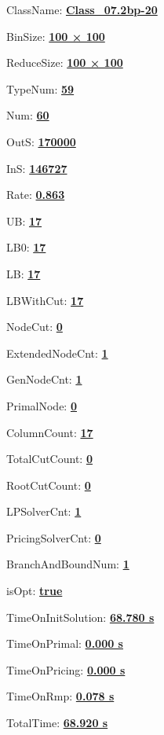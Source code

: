 \documentclass[11pt]{article}
\begin{document}
\pagestyle{empty}


ClassName: \underline{\textbf{Class_07.2bp-20}}
\par
BinSize: \underline{\textbf{100 × 100}}
\par
ReduceSize: \underline{\textbf{100 × 100}}
\par
TypeNum: \underline{\textbf{59}}
\par
Num: \underline{\textbf{60}}
\par
OutS: \underline{\textbf{170000}}
\par
InS: \underline{\textbf{146727}}
\par
Rate: \underline{\textbf{0.863}}
\par
UB: \underline{\textbf{17}}
\par
LB0: \underline{\textbf{17}}
\par
LB: \underline{\textbf{17}}
\par
LBWithCut: \underline{\textbf{17}}
\par
NodeCut: \underline{\textbf{0}}
\par
ExtendedNodeCnt: \underline{\textbf{1}}
\par
GenNodeCnt: \underline{\textbf{1}}
\par
PrimalNode: \underline{\textbf{0}}
\par
ColumnCount: \underline{\textbf{17}}
\par
TotalCutCount: \underline{\textbf{0}}
\par
RootCutCount: \underline{\textbf{0}}
\par
LPSolverCnt: \underline{\textbf{1}}
\par
PricingSolverCnt: \underline{\textbf{0}}
\par
BranchAndBoundNum: \underline{\textbf{1}}
\par
isOpt: \underline{\textbf{true}}
\par
TimeOnInitSolution: \underline{\textbf{68.780 s}}
\par
TimeOnPrimal: \underline{\textbf{0.000 s}}
\par
TimeOnPricing: \underline{\textbf{0.000 s}}
\par
TimeOnRmp: \underline{\textbf{0.078 s}}
\par
TotalTime: \underline{\textbf{68.920 s}}
\par
\newpage


\end{document}
